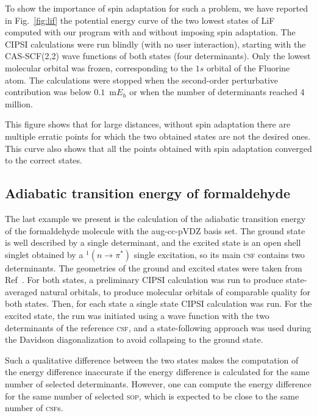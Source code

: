 \documentclass[aip,jcp,reprint,showkeys]{revtex4-1}
\newcommand{\sop}{\textsc{sop}}
\newcommand{\csf}{\textsc{csf}}
\begin{document}
To show the importance of spin adaptation for such a problem, we have reported
in Fig.~\ref{fig:lif} the potential energy curve of the two lowest states of
LiF computed with our program with and without imposing spin adaptation.  The
CIPSI calculations were run blindly (with no user interaction), starting with
the CAS-SCF(2,2) wave functions of both states (four determinants). Only the
lowest molecular orbital was frozen, corresponding to the $1s$ orbital of the
Fluorine atom. The calculations were stopped when the second-order perturbative
contribution was below $0.1$~m$E_h$ or when the number of determinants reached
4 million.

This figure shows that for large distances, without spin adaptation there are
multiple erratic points for which the two obtained states are not the desired
ones. This curve also shows that all the points obtained with spin adaptation
converged to the correct states.

\subsection{Adiabatic transition energy of formaldehyde}

The last example we present is the calculation of the adiabatic transition
energy of the formaldehyde molecule with the aug-cc-pVDZ basis set.  The ground
state is well described by a single determinant, and the excited state is an
open shell singlet obtained by a $^1(n \rightarrow \pi^*)$ single excitation,
so its main {\csf} contains two determinants.  The geometries of the ground and
excited states were taken from Ref~\citep{Loos_2018}. For both states, a
preliminary CIPSI calculation was run to produce state-averaged natural
orbitals, to produce molecular orbitals of comparable quality for both states.
Then, for each state a single state CIPSI calculation was run.
For the excited state, the run was initiated using a wave function with
the two determinants of the reference \csf , and a state-following approach was
used during the Davidson diagonalization to avoid collapsing to the ground state.

Such a qualitative difference between the two states makes the computation of
the energy difference inaccurate if the energy difference is calculated for the
same number of selected determinants.  However, one can compute the energy
difference for the same number of selected \sop, which is expected to be close
to the same number of \csf s.
\end{document}
